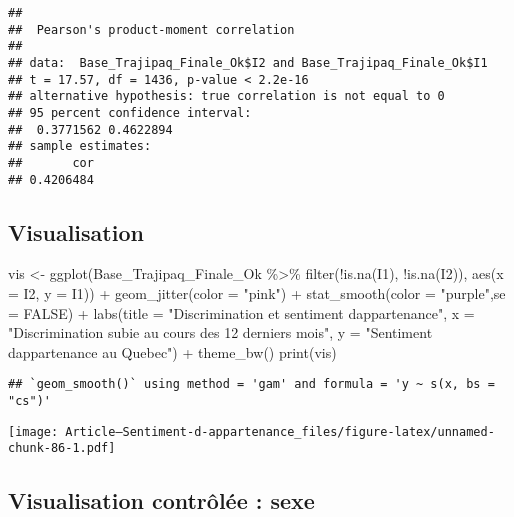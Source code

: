 \documentclass[
]{article}
\newenvironment{Shaded}{\begin{snugshade}}{\end{snugshade}}
\newcommand{\AttributeTok}[1]{\textcolor[rgb]{0.77,0.63,0.00}{#1}}
\newcommand{\ConstantTok}[1]{\textcolor[rgb]{0.00,0.00,0.00}{#1}}
\newcommand{\FunctionTok}[1]{\textcolor[rgb]{0.00,0.00,0.00}{#1}}
\newcommand{\NormalTok}[1]{#1}
\newcommand{\OtherTok}[1]{\textcolor[rgb]{0.56,0.35,0.01}{#1}}
\newcommand{\SpecialCharTok}[1]{\textcolor[rgb]{0.00,0.00,0.00}{#1}}
\newcommand{\StringTok}[1]{\textcolor[rgb]{0.31,0.60,0.02}{#1}}
\begin{document}
\begin{verbatim}
## 
##  Pearson's product-moment correlation
## 
## data:  Base_Trajipaq_Finale_Ok$I2 and Base_Trajipaq_Finale_Ok$I1
## t = 17.57, df = 1436, p-value < 2.2e-16
## alternative hypothesis: true correlation is not equal to 0
## 95 percent confidence interval:
##  0.3771562 0.4622894
## sample estimates:
##       cor 
## 0.4206484
\end{verbatim}

\hypertarget{visualisation}{%
\subsection{Visualisation}\label{visualisation}}

\begin{Shaded}
\begin{Highlighting}[]
\NormalTok{vis }\OtherTok{\textless{}{-}} \FunctionTok{ggplot}\NormalTok{(Base\_Trajipaq\_Finale\_Ok }\SpecialCharTok{\%\textgreater{}\%}
                \FunctionTok{filter}\NormalTok{(}\SpecialCharTok{!}\FunctionTok{is.na}\NormalTok{(I1), }\SpecialCharTok{!}\FunctionTok{is.na}\NormalTok{(I2)), }\FunctionTok{aes}\NormalTok{(}\AttributeTok{x =}\NormalTok{ I2, }\AttributeTok{y =}\NormalTok{ I1)) }\SpecialCharTok{+}
  \FunctionTok{geom\_jitter}\NormalTok{(}\AttributeTok{color =} \StringTok{"pink"}\NormalTok{) }\SpecialCharTok{+}
  \FunctionTok{stat\_smooth}\NormalTok{(}\AttributeTok{color =} \StringTok{"purple"}\NormalTok{,}\AttributeTok{se =} \ConstantTok{FALSE}\NormalTok{) }\SpecialCharTok{+}
  \FunctionTok{labs}\NormalTok{(}\AttributeTok{title =} \StringTok{"Discrimination et sentiment d\textquotesingle{}appartenance"}\NormalTok{, }
       \AttributeTok{x =} \StringTok{"Discrimination subie au cours des 12 derniers mois"}\NormalTok{, }
       \AttributeTok{y =} \StringTok{"Sentiment d\textquotesingle{}appartenance au Quebec"}\NormalTok{) }\SpecialCharTok{+}
  \FunctionTok{theme\_bw}\NormalTok{()}
\FunctionTok{print}\NormalTok{(vis)}
\end{Highlighting}
\end{Shaded}

\begin{verbatim}
## `geom_smooth()` using method = 'gam' and formula = 'y ~ s(x, bs = "cs")'
\end{verbatim}

\texttt{[image: Article---Sentiment-d-appartenance\_files/figure-latex/unnamed-chunk-86-1.pdf]}

\hypertarget{visualisation-contruxf4luxe9e-sexe}{%
\subsection{Visualisation contrôlée :
sexe}\label{visualisation-contruxf4luxe9e-sexe}}
\end{document}
